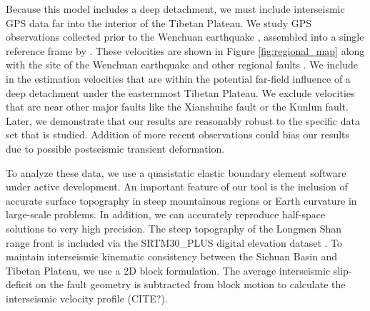 \documentclass[12pt]{article}
\begin{document}
Because this model includes a deep detachment, we must include interseismic GPS data far into the interior of the Tibetan Plateau. We study GPS observations collected prior to the Wenchuan earthquake \citep{apel06,Banerjee2008,calais06, gan07, vigny03}, assembled into a single reference frame by \citet{Loveless2011}. These velocities are shown in Figure \ref{fig:regional_map} along with the site of the Wenchuan earthquake and other regional faults \citep{Taylor09}. We include in the estimation velocities that are within the potential far-field influence of a deep detachment under the easternmost Tibetan Plateau. We exclude velocities that are near other major faults like the Xianshuihe fault or the Kunlun fault. Later, we demonstrate that our results are reasonably robust to the specific data set that is studied. Addition of more recent observations could bias our results due to possible postseismic transient deformation.

To analyze these data, we use a quasistatic elastic boundary element software under active development. An important feature of our tool is the inclusion of accurate surface topography in steep mountainous regions or Earth curvature in large-scale problems. In addition, we can accurately reproduce half-space solutions to very high precision. The steep topography of the Longmen Shan range front is included via the SRTM30\_PLUS digital elevation dataset \citep{Becker2009}. To maintain interseismic kinematic consistency between the Sichuan Basin and Tibetan Plateau, we use a 2D block formulation. The average interseismic slip-deficit on the fault geometry is subtracted from block motion to calculate the interseismic velocity profile (CITE?).
\end{document}
